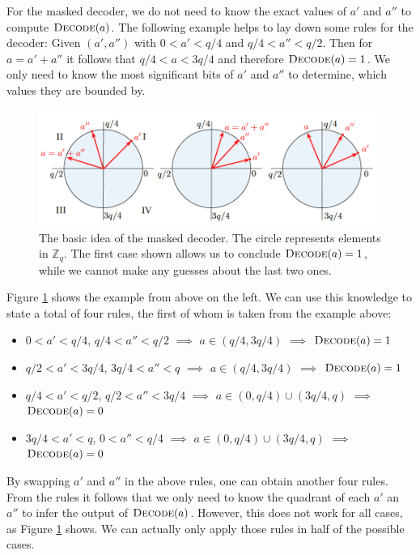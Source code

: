 For the masked decoder, we do not need to know the exact values of \(a'\) and \(a''\) to compute \(\textsc{Decode}(a)\). The following example helps to lay down some rules for the decoder: Given \((a', a'')\) with \(0 < a' < q/4\) and \(q/4 < a'' < q/2\). Then for \(a=a'+a''\) it follows that \(q/4 < a < 3q/4\) and therefore \(\textsc{Decode}(a)=1\). We only need to know the most significant bits of \(a'\) and \(a''\) to determine, which values they are bounded by.
\begin{figure}[H]
	\centering
	\includegraphics[width=\textwidth]{maskedDecoder_1.png}
	\caption{The basic idea of the masked decoder. The circle represents elements in \(\mathbb{Z}_q\). The first case shown allows us to conclude \(\textsc{Decode}(a)=1\), while we cannot make any guesses about the last two ones. \cite{maskedRing}}
	\label{maskedDecoder_1}
\end{figure}
Figure \ref{maskedDecoder_1} shows the example from above on the left. We can use this knowledge to state a total of four rules, the first of whom is taken from the example above:
\begin{itemize}
\item \(0 < a' < q/4\), \(q/4 < a'' < q/2\) \(\implies\) \(a \in (q/4,3q/4)\) \(\implies\) \(\textsc{Decode}(a)=1\)
\item \(q/2 < a' < 3q/4\), \(3q/4 < a'' < q\) \(\implies\) \(a \in (q/4,3q/4)\) \(\implies\) \(\textsc{Decode}(a)=1\)
\item \(q/4 < a' < q/2\), \(q/2 < a'' < 3q/4\) \(\implies\) \(a \in (0,q/4) \cup (3q/4,q)\) \(\implies\) \(\textsc{Decode}(a)=0\)
\item \(3q/4 < a' < q\), \(0 < a'' < q/4\) \(\implies\) \(a \in (0,q/4) \cup (3q/4,q)\) \(\implies\) \(\textsc{Decode}(a)=0\)
\end{itemize}
By swapping \(a'\) and \(a''\) in the above rules, one can obtain another four rules. From the rules it follows that we only need to know the quadrant of each \(a'\) an \(a''\) to infer the output of \(\textsc{Decode}(a)\). However, this does not work for all cases, as Figure \ref{maskedDecoder_1} shows. We can actually only apply those rules in half of the possible cases.

